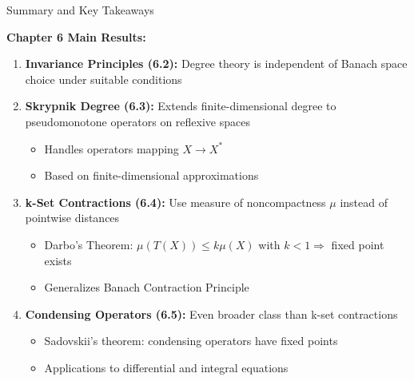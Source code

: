 \documentclass[aspectratio=169,10pt]{beamer}
\begin{document}
\begin{frame}{Summary and Key Takeaways}

\textbf{Chapter 6 Main Results:}

\begin{enumerate}
    \item \textbf{Invariance Principles (6.2):} Degree theory is independent of Banach space choice under suitable conditions

    \item \textbf{Skrypnik Degree (6.3):} Extends finite-dimensional degree to pseudomonotone operators on reflexive spaces
    \begin{itemize}
        \item Handles operators mapping $X \to X^*$
        \item Based on finite-dimensional approximations
    \end{itemize}

    \item \textbf{k-Set Contractions (6.4):} Use measure of noncompactness $\mu$ instead of pointwise distances
    \begin{itemize}
        \item Darbo's Theorem: $\mu(T(X)) \leq k\mu(X)$ with $k < 1 \Rightarrow$ fixed point exists
        \item Generalizes Banach Contraction Principle
    \end{itemize}

    \item \textbf{Condensing Operators (6.5):} Even broader class than k-set contractions
    \begin{itemize}
        \item Sadovskii's theorem: condensing operators have fixed points
        \item Applications to differential and integral equations
    \end{itemize}
\end{enumerate}

\end{frame}
\end{document}
